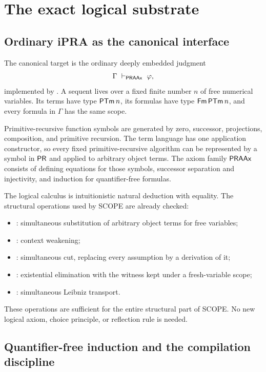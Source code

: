 \section{The exact logical substrate}

\subsection{Ordinary iPRA as the canonical interface}

The canonical target is the ordinary deeply embedded judgment
\[
  \Gamma\ \vdash_{\mathsf{PRAAx}}\ \varphi,
\]
implemented by .  A sequent lives over a fixed finite number \(n\) of free numerical variables.  Its terms have type \(\mathsf{PTm}\,n\), its formulas have type \(\mathsf{Fm}\,\mathsf{PTm}\,n\), and every formula in \(\Gamma\) has the same scope.

Primitive-recursive function symbols are generated by zero, successor, projections, composition, and primitive recursion.  The term language has one application constructor, so every fixed primitive-recursive algorithm can be represented by a symbol in \(\mathsf{PR}\) and applied to arbitrary object terms.  The axiom family \(\mathsf{PRAAx}\) consists of defining equations for those symbols, successor separation and injectivity, and induction for quantifier-free formulas.

The logical calculus is intuitionistic natural deduction with equality.  The structural operations used by SCOPE are already checked:

\begin{itemize}
\item {}: simultaneous substitution of arbitrary object terms for free variables;
\item {}: context weakening;
\item {}: simultaneous cut, replacing every assumption by a derivation of it;
\item {}: existential elimination with the witness kept under a fresh-variable scope;
\item {}: simultaneous Leibniz transport.
\end{itemize}

These operations are sufficient for the entire structural part of SCOPE.  No new logical axiom, choice principle, or reflection rule is needed.

\subsection{Quantifier-free induction and the compilation discipline}

